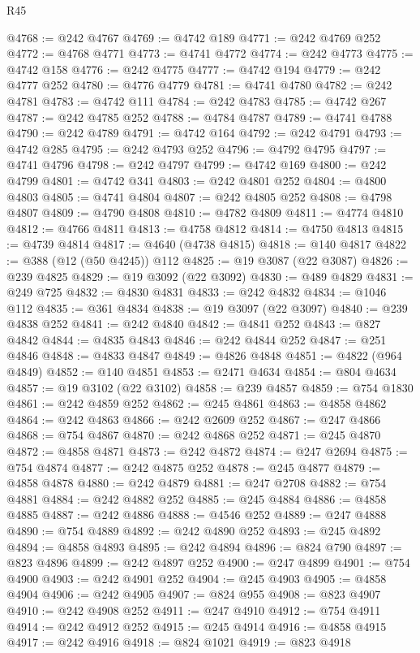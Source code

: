 \begin{lexlean}{R45}
\begin{coremodule}
{@4768 := @242 @4767
@4769 := @4742 @189
@4771 := @242 @4769 @252
@4772 := @4768 @4771
@4773 := @4741 @4772
@4774 := @242 @4773
@4775 := @4742 @158
@4776 := @242 @4775
@4777 := @4742 @194
@4779 := @242 @4777 @252
@4780 := @4776 @4779
@4781 := @4741 @4780
@4782 := @242 @4781
@4783 := @4742 @111
@4784 := @242 @4783
@4785 := @4742 @267
@4787 := @242 @4785 @252
@4788 := @4784 @4787
@4789 := @4741 @4788
@4790 := @242 @4789
@4791 := @4742 @164
@4792 := @242 @4791
@4793 := @4742 @285
@4795 := @242 @4793 @252
@4796 := @4792 @4795
@4797 := @4741 @4796
@4798 := @242 @4797
@4799 := @4742 @169
@4800 := @242 @4799
@4801 := @4742 @341
@4803 := @242 @4801 @252
@4804 := @4800 @4803
@4805 := @4741 @4804
@4807 := @242 @4805 @252
@4808 := @4798 @4807
@4809 := @4790 @4808
@4810 := @4782 @4809
@4811 := @4774 @4810
@4812 := @4766 @4811
@4813 := @4758 @4812
@4814 := @4750 @4813
@4815 := @4739 @4814
@4817 := @4640 (@4738 @4815)
@4818 := @140 @4817
@4822 := @388 (@12 (@50 @4245)) @112
@4825 := @19 @3087 (@22 @3087)
@4826 := @239 @4825
@4829 := @19 @3092 (@22 @3092)
@4830 := @489 @4829
@4831 := @249 @725
@4832 := @4830 @4831
@4833 := @242 @4832
@4834 := @1046 @112
@4835 := @361 @4834
@4838 := @19 @3097 (@22 @3097)
@4840 := @239 @4838 @252
@4841 := @242 @4840
@4842 := @4841 @252
@4843 := @827 @4842
@4844 := @4835 @4843
@4846 := @242 @4844 @252
@4847 := @251 @4846
@4848 := @4833 @4847
@4849 := @4826 @4848
@4851 := @4822 (@964 @4849)
@4852 := @140 @4851
@4853 := @2471 @4634
@4854 := @804 @4634
@4857 := @19 @3102 (@22 @3102)
@4858 := @239 @4857
@4859 := @754 @1830
@4861 := @242 @4859 @252
@4862 := @245 @4861
@4863 := @4858 @4862
@4864 := @242 @4863
@4866 := @242 @2609 @252
@4867 := @247 @4866
@4868 := @754 @4867
@4870 := @242 @4868 @252
@4871 := @245 @4870
@4872 := @4858 @4871
@4873 := @242 @4872
@4874 := @247 @2694
@4875 := @754 @4874
@4877 := @242 @4875 @252
@4878 := @245 @4877
@4879 := @4858 @4878
@4880 := @242 @4879
@4881 := @247 @2708
@4882 := @754 @4881
@4884 := @242 @4882 @252
@4885 := @245 @4884
@4886 := @4858 @4885
@4887 := @242 @4886
@4888 := @4546 @252
@4889 := @247 @4888
@4890 := @754 @4889
@4892 := @242 @4890 @252
@4893 := @245 @4892
@4894 := @4858 @4893
@4895 := @242 @4894
@4896 := @824 @790
@4897 := @823 @4896
@4899 := @242 @4897 @252
@4900 := @247 @4899
@4901 := @754 @4900
@4903 := @242 @4901 @252
@4904 := @245 @4903
@4905 := @4858 @4904
@4906 := @242 @4905
@4907 := @824 @955
@4908 := @823 @4907
@4910 := @242 @4908 @252
@4911 := @247 @4910
@4912 := @754 @4911
@4914 := @242 @4912 @252
@4915 := @245 @4914
@4916 := @4858 @4915
@4917 := @242 @4916
@4918 := @824 @1021
@4919 := @823 @4918
}
\end{coremodule}
\end{lexlean}
